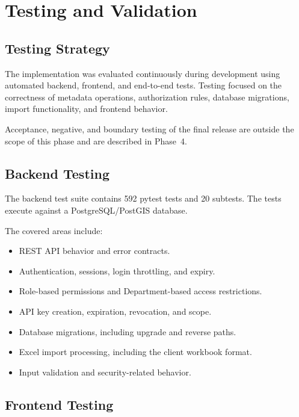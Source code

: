 \documentclass[11pt,a4paper]{article}
\begin{document}

\section{Testing and Validation}

\subsection{Testing Strategy}

The implementation was evaluated continuously during development
using automated backend, frontend, and end-to-end tests.
Testing focused on the correctness of metadata operations,
authorization rules, database migrations, import functionality,
and frontend behavior.

Acceptance, negative, and boundary testing of the final release
are outside the scope of this phase and are described in Phase~4.

\subsection{Backend Testing}

The backend test suite contains 592 pytest tests and 20 subtests.
The tests execute against a PostgreSQL/PostGIS database.

The covered areas include:

\begin{itemize}
    \item REST API behavior and error contracts.
    \item Authentication, sessions, login throttling, and expiry.
    \item Role-based permissions and Department-based access restrictions.
    \item API key creation, expiration, revocation, and scope.
    \item Database migrations, including upgrade and reverse paths.
    \item Excel import processing, including the client workbook format.
    \item Input validation and security-related behavior.
\end{itemize}

\subsection{Frontend Testing}
\end{document}
